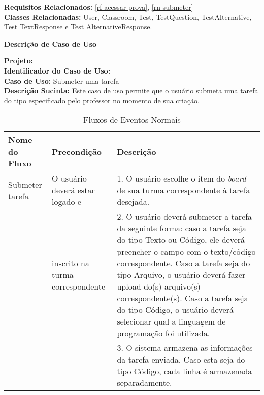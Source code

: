 \noindent  \textbf{Requisitos Relacionados:} \ref{rf-acessar-prova}, \ref{rn-submeter}       \\ \textbf{Classes Relacionadas:} User, Classroom, Test, TestQuestion, TestAlternative, Test TextResponse e Test AlternativeResponse.

\newpage	
\clearpage
\begin{flushright}    \textbf{Descrição de Caso de Uso}   \end{flushright}         
\noindent \textbf{Projeto:} \imprimirtitulo  \\
\textbf{Identificador do Caso de Uso:} \UC\label{uc-submeter-tarefa} \\
\textbf{Caso de Uso:} Submeter uma tarefa \\
\noindent \textbf{Descrição Sucinta:} Este caso de uso permite que o usuário submeta uma tarefa do tipo especificado pelo professor no momento de sua criação.\\

\begin{table}[H]
	\centering \vspace{0.5cm} \footnotesize
	\caption{Fluxos de Eventos Normais}
	\begin{tabular}{|p{2.3cm}|p{2.5cm}|p{10cm}|} \hline  \rowcolor[rgb]{0.8,0.8,0.8}
		
		Nome do Fluxo & Precondição & Descrição  \\ \hline		
		
		Submeter tarefa & O usuário deverá estar logado e & 1. O usuário escolhe o item do \textit{board} de sua turma correspondente à tarefa desejada.  \\
		{}    &  inscrito na turma correspondente & 2. O usuário deverá submeter a tarefa da seguinte forma: caso a tarefa seja do tipo Texto ou Código, ele deverá preencher o campo com o texto/código correspondente. Caso a tarefa seja do tipo Arquivo, o usuário deverá fazer upload do(s) arquivo(s) correspondente(s). Caso a tarefa seja do tipo Código, o usuário deverá selecionar qual a linguagem de programação foi utilizada.\\
		{}    & {} & 3. O sistema armazena as informações da tarefa enviada. Caso esta seja do tipo Código, cada linha é armazenada separadamente. \\ \hline
		
		
	\end{tabular}
\end{table}

